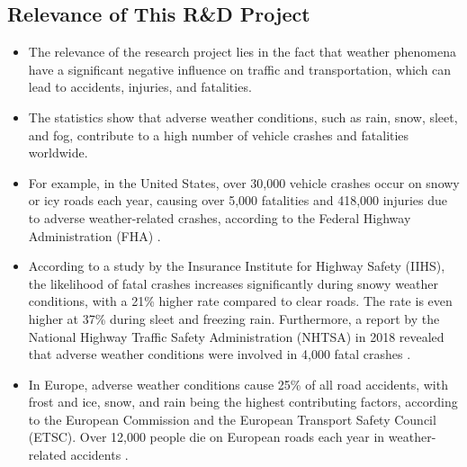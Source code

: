 \documentclass[rnd]{mas_proposal}
\begin{document}
\begin{itemize}


\end{itemize}

\subsection{Relevance of This R\&D Project}
\begin{itemize}

    \item The relevance of the research project lies in the fact that weather phenomena have a significant negative influence on traffic and transportation, which can lead to accidents, injuries, and fatalities.

    \item The statistics show that adverse weather conditions, such as rain, snow, sleet, and fog, contribute to a high number of vehicle crashes and fatalities worldwide.

    \item For example, in the United States, over 30,000 vehicle crashes occur on snowy or icy roads each year, causing over 5,000 fatalities and 418,000 injuries due to adverse weather-related crashes, according to the Federal Highway Administration (FHA) \cite{federal-highway-administration-no-date} \cite{usDepartmentofCommerce2016}.

    \item According to a study by the Insurance Institute for Highway Safety (IIHS), the likelihood of fatal crashes increases significantly during snowy weather conditions, with a 21\% higher rate compared to clear roads. The rate is even higher at 37\% during sleet and freezing rain. Furthermore, a report by the National Highway Traffic Safety Administration (NHTSA) in 2018 revealed that adverse weather conditions were involved in 4,000 fatal crashes \cite{brumbelow2022light}.

    \item In Europe, adverse weather conditions cause 25\% of all road accidents, with frost and ice, snow, and rain being the highest contributing factors, according to the European Commission and the European Transport Safety Council (ETSC). Over 12,000 people die on European roads each year in weather-related accidents \cite{cookson-2022}.


\end{itemize}
\end{document}
